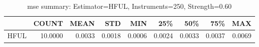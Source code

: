 \begin{table}[ht]
\centering
\caption{mse summary: Estimator=HFUL, Instruments=250, Strength=0.60}
\begin{tabular}{lrrrrrrrr}
\toprule
 & COUNT & MEAN & STD & MIN & 25\% & 50\% & 75\% & MAX \\
\midrule
HFUL & 10.0000 & 0.0033 & 0.0018 & 0.0006 & 0.0024 & 0.0033 & 0.0037 & 0.0069 \\
\bottomrule
\end{tabular}
\end{table}
